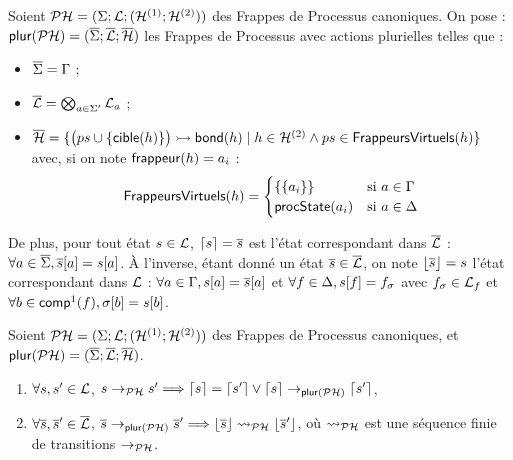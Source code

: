 \begin{definition}
  Soient $\mathcal{PH} = (\Sigma; \mathcal{L}; (\mathcal{H}^{(1)}; \mathcal{H}^{(2)}))$ des Frappes de Processus canoniques.
  On pose : $\mathsf{plur}(\mathcal{PH}) = (\overline{\Sigma}; \overline{\mathcal{L}}; \overline{\mathcal{H}})$ les Frappes de Processus
  avec actions plurielles telles que :
  \begin{itemize}
    \item $\overline{\Sigma} = \mathrm{\Gamma}$ ;
    \item $\overline{\mathcal{L}} = \bigotimes_{a \in \Sigma'} \mathcal{L}_a$ ;
    \item $\overline{\mathcal{H}} = \{ \mbox{$\big( ps \cup \{ \mathsf{cible}(h) \} \big) \rightarrowtail \mathsf{bond}(h)$}
      \mid h \in \mathcal{H}^{(2)} \wedge ps \in \mathsf{FrappeursVirtuels}(h) \}$
    avec, si on note $\mathsf{frappeur}(h) = a_i$ :
    \[\mathsf{FrappeursVirtuels}(h) =
      \begin{cases}
        \{ \{ a_i \} \} & \text{si } a \in \mathrm{\Gamma} \\
        \mathsf{procState}(a_i) & \text{si } a \in \Delta
      \end{cases}\]
  \end{itemize}
  De plus, pour tout état $s \in \mathcal{L}$,
  $\lceil s \rceil = \overline{s}$ est l'état correspondant dans $\overline{\mathcal{L}}$ :
  $\forall a \in \overline{\Sigma}, {\overline{s}[a]} = {s[a]}$.
  À l'inverse, étant donné un état $\overline{s} \in \overline{\mathcal{L}}$,
  on note $\lfloor \overline{s} \rfloor = s$ l'état correspondant dans $\mathcal{L}$ :
  $\forall a \in \mathrm{\Gamma}, {s[a]} = {\overline{s}[a]}$
  et $\forall f \in \Delta, {s[f]} = f_\sigma$
  avec $f_\sigma \in \mathcal{L}_f$
  et $\forall b \in \mathsf{comp}^1(f), {\sigma[b]} = {s[b]}$.
\end{definition}

\begin{theorem}[$\PH \approx \PHmult(\PH)$]
  Soient $\mathcal{PH} = (\Sigma; \mathcal{L}; (\mathcal{H}^{(1)}; \mathcal{H}^{(2)}))$ des Frappes de Processus canoniques,
  et $\mathsf{plur}(\mathcal{PH}) = (\overline{\Sigma}; \overline{\mathcal{L}}; \overline{\mathcal{H}})$.
  \begin{enumerate}
    \item \label{bisimulph2phm} $\forall s, s' \in \mathcal{L}$,
      $s \rightarrow_{\mathcal{PH}} s' \Longrightarrow
      \lceil s \rceil = \lceil s' \rceil \vee \lceil s \rceil \rightarrow_{\mathsf{plur}(\mathcal{PH})} \lceil s' \rceil$,
    \item \label{bisimulphm2ph} $\forall \overline{s}, \overline{s}' \in \overline{\mathcal{L}}$,
      $\overline{s} \rightarrow_{\mathsf{plur}(\mathcal{PH})} \overline{s}' \Longrightarrow
      \lfloor \overline{s} \rfloor \rightsquigarrow_{\mathcal{PH}} \lfloor \overline{s}' \rfloor$,
      où $\rightsquigarrow_{\mathcal{PH}}$ est une séquence finie de transitions $\rightarrow_{\mathcal{PH}}$.
  \end{enumerate}
\end{theorem}

